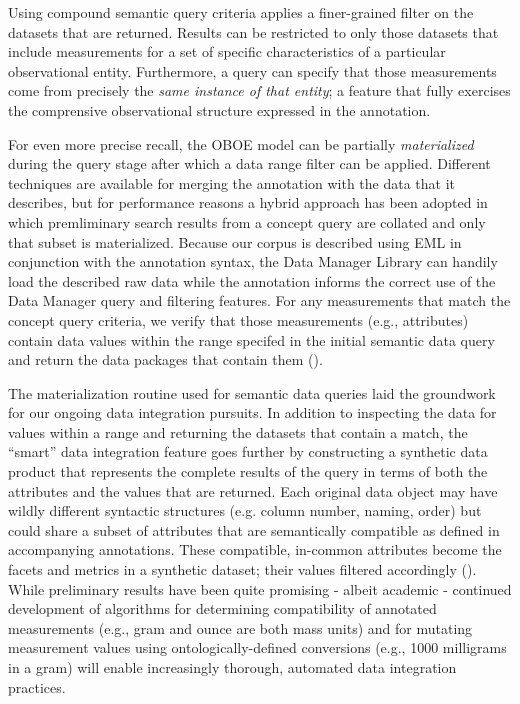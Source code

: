 Using compound semantic query criteria applies a finer-grained filter on the datasets that are
returned. Results can be restricted to only those datasets that include 
measurements for a set of specific characteristics of a particular
observational entity. Furthermore, a query can specify that those measurements come
from precisely the \emph{same instance of that entity}; a feature that fully exercises the comprensive observational structure expressed in the annotation.

 For even more precise recall, the OBOE model can be partially \emph{materialized} during the query stage after which a data range filter can be applied. Different techniques are available for merging the annotation with the data that it describes, but for performance reasons a hybrid approach has been adopted in which premliminary search results from a concept query are collated and only that subset is materialized. Because our corpus is described using EML in conjunction with the annotation syntax, the Data Manager Library can handily load the described raw data while the annotation informs the correct use of the Data Manager query and filtering features. For any measurements that match the concept query criteria, we verify that those measurements (e.g., attributes) contain data values within the range specifed in the initial semantic data query and return the data packages that contain them ().

 The materialization routine used for semantic data queries laid the groundwork for our ongoing data integration pursuits. In addition to inspecting the data for values within a range and returning the datasets that contain a match, the ``smart'' data integration feature goes further by constructing a synthetic data product that represents the complete results of the query in terms of both the attributes and the values that are returned. Each original data object may have wildly different syntactic structures (e.g. column number, naming, order) but could share a subset of attributes that are semantically compatible as defined in accompanying annotations. These compatible, in-common attributes become the facets and metrics in a synthetic dataset; their values filtered accordingly (). While preliminary results have been quite promising - albeit academic - continued development of algorithms for determining compatibility of annotated measurements (e.g., gram and ounce are both mass units) and for mutating measurement values using ontologically-defined conversions (e.g., 1000 milligrams in a gram) will enable increasingly thorough, automated data integration practices.


